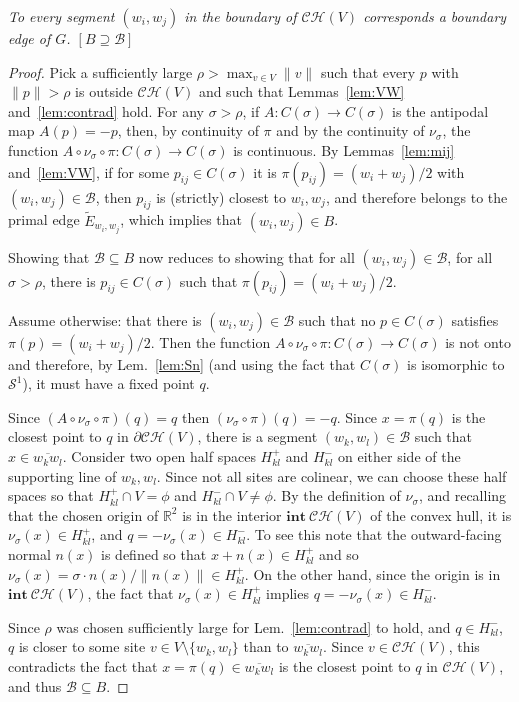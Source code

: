 \documentclass[11pt]{article}
\begin{document}
\emph{
To every segment $(w_i,w_j)$ in the boundary of
$\mathcal{CH}(V)$ corresponds a boundary edge of $G$.  \emph{$[B\supseteq\mathcal{B}]$}
}
\begin{proof}  
Pick a sufficiently large $\rho > \max_{v\in V}\|v\|$ such that every $p$ with
$\|p\| > \rho$ is outside $\mathcal{CH}(V)$ and such that Lemmas~\ref{lem:VW} and~\ref{lem:contrad} hold. 
For any $\sigma > \rho$, if $A:C(\sigma)\rightarrow C(\sigma)$ is the antipodal map $A(p) = -p$, 
then, by continuity of $\pi$ and by the continuity of $\nu_\sigma$, the function $A\circ\nu_\sigma\circ\pi:C(\sigma)\rightarrow C(\sigma)$ is
continuous. 
By Lemmas~\ref{lem:mij} and~\ref{lem:VW}, if for some $p_{ij}\in C(\sigma)$ it is 
$\pi(p_{ij})= (w_i+w_j)/2$ with
$(w_i,w_j)\in\mathcal{B}$, then $p_{ij}$ is (strictly) closest to
$w_i,w_j$, and therefore belongs to the primal edge $\tilde{E}_{w_i,w_j}$, which implies
that $(w_i,w_j)\in B$. 

Showing that $\mathcal{B}\subseteq B$ now reduces to showing that for all 
$(w_i,w_j)\in\mathcal{B}$, for all $\sigma > \rho$, there is $p_{ij}\in
C(\sigma)$ such that
$\pi(p_{ij})= (w_i+w_j)/2$. 

Assume otherwise: that there is $(w_i,w_j)\in\mathcal{B}$ such that no $p\in
C(\sigma)$ satisfies $\pi(p) = (w_i+w_j)/2$. Then the function 
$A\circ\nu_\sigma\circ\pi:C(\sigma)\rightarrow C(\sigma)$ is not onto and therefore, 
by Lem.~\ref{lem:Sn} (and using the fact that $C(\sigma)$ is isomorphic to $\mathcal{S}^1$), 
it must have a fixed point $q$. 

Since $(A\circ\nu_\sigma\circ\pi)(q) = q$ then $(\nu_\sigma\circ\pi)(q) = -q$. 
Since $x=\pi(q)$ is the closest point to $q$ in $\partial\mathcal{CH}(V)$, 
	there is a segment $(w_k,w_l)\in\mathcal{B}$ such that
$x\in\overline{w_k w_l}$. Consider two open half spaces
$H^{+}_{kl}$ and $H^{-}_{kl}$ on either side of the supporting line of
$w_k,w_l$. Since not all sites are colinear, we can choose these half spaces so that 
$H^{+}_{kl}\cap V=\phi$ and $H^{-}_{kl}\cap V \neq \phi$. 
By the definition of $\nu_\sigma$, and recalling that the chosen origin of
$\mathbb{R}^2$ is in the interior $\mathbf{int\ }{\mathcal{CH}(V)}$ of the convex hull, 
it is $\nu_\sigma(x)\in H^{+}_{kl}$, and $q=-\nu_\sigma(x)\in H^{-}_{kl}$. 
To see this note that the outward-facing normal $n(x)$ is defined so that
$x+n(x)\in H^{+}_{kl}$ and so $\nu_\sigma(x) = \sigma\cdot n(x) / \|n(x)\| \in  H^{+}_{kl}$.
On the other hand, since the origin is in
$\mathbf{int\ }{\mathcal{CH}(V)}$, the fact that $\nu_\sigma(x)\in H^{+}_{kl}$ 
implies $q=-\nu_\sigma(x)\in  H^{-}_{kl}$. 

Since $\rho$ was chosen sufficiently large for Lem.~\ref{lem:contrad} to
hold, and $q\in  H^{-}_{kl}$, $q$ is closer to some site $v\in
V\setminus\{w_k,w_l\}$ than to $\overline{w_k w_l}$. 
Since $v\in\mathcal{CH}(V)$, this contradicts the fact
that $x=\pi(q)\in\overline{w_k w_l}$ is the closest point to $q$ in
$\mathcal{CH}(V)$, and thus $\mathcal{B}\subseteq B$.
\end{proof}
\end{document}
